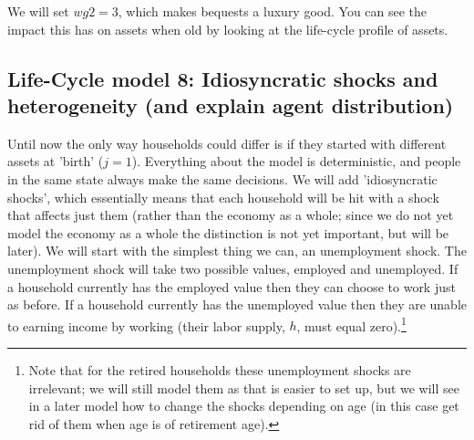 We will set $wg2=3$, which makes bequests a luxury good. You can see the impact this has on assets when old by looking at the life-cycle profile of assets.

\subsection{Life-Cycle model 8: Idiosyncratic shocks and heterogeneity (and explain agent distribution)}
Until now the only way households could differ is if they started with different assets at 'birth' ($j=1$). Everything about the model is deterministic, and people in the same state always make the same decisions. We will add 'idiosyncratic shocks', which essentially means that each household will be hit with a shock that affects just them (rather than the economy as a whole; since we do not yet model the economy as a whole the distinction is not yet important, but will be later). We will start with the simplest thing we can, an unemployment shock. The unemployment shock will take two possible values, employed and unemployed. If a household currently has the employed value then they can choose to work just as before. If a household currently has the unemployed value then they are unable to earning income by working (their labor supply, $h$, must equal zero).\footnote{Note that for the retired households these unemployment shocks are irrelevant; we will still model them as that is easier to set up, but we will see in a later model how to change the shocks depending on age (in this case get rid of them when age is of retirement age).}

